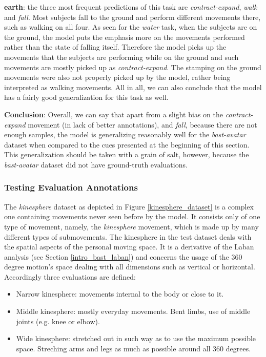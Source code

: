 \documentclass[extern,palatino]{cgMA}
\begin{document}
\bigskip
\noindent\textbf{earth}: the three most frequent predictions of this task are \textit{contract-expand}, \textit{walk} and \textit{fall}. Most subjects fall to the ground and perform different movements there, such as walking on all four. As seen for the \textit{water} task, when the subjects are on the ground, the model puts the emphasis more on the movements performed rather than the state of falling itself. Therefore the model picks up the movements that the subjects are performing while on the ground and such movements are mostly picked up as \textit{contract-expand}. The stamping on the ground movements were also not properly picked up by the model, rather being interpreted as walking movements. All in all, we can also conclude that the model has a fairly good generalization for this task as well.

\bigskip \bigskip
\noindent\textbf{Conclusion}: Overall, we can say that apart from a slight bias on the \textit{contract-expand} movement (in lack of better annotations), and \textit{fall}, because there are not enough samples, the model is generalizing reasonably well for the \textit{bast-avatar} dataset when compared to the cues presented at the beginning of this section. This generalization should be taken with a grain of salt, however, because the \textit{bast-avatar} dataset did not have ground-truth evaluations.
\bigskip

\subsubsection{Testing Evaluation Annotations}
\label{research_question_3_2}

The \textit{kinesphere} dataset as depicted in Figure \ref{kinesphere_dataset} is a complex one containing movements never seen before by the model. It consists only of one type of movement, namely, the \textit{kinesphere} movement, which is made up by many different types of submovements. The kinesphere in the test dataset deals with the spatial aspects of the personal moving space. It is a derivative of the Laban analysis (see Section \ref{intro_bast_laban}) and concerns the usage of the 360 degree motion's space dealing with all dimensions such as vertical or horizontal. Accordingly three evaluations are defined: 
\begin{itemize}
    \item Narrow kinesphere: movements internal to the body or close to it.
    \item Middle kinesphere: mostly everyday movements. Bent limbs, use of middle joints (e.g. knee or elbow). 
    \item Wide kinesphere: stretched out in such way as to use the maximum possible space. Streching arms and legs as much as possible around all 360 degrees.
\end{itemize}
\end{document}
